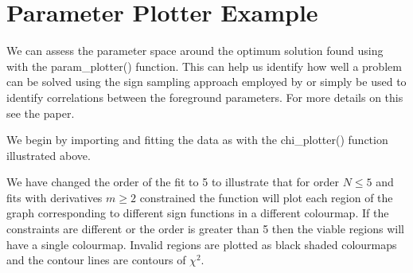 \documentclass[letterpaper,10pt,english]{sphinxmanual}
\let\sphinxpxdimen\pdfpxdimen\else\newdimen\sphinxpxdimen
\begin{document}
\noindent{\hspace*{\fill}\sphinxincludegraphics[width=400\sphinxpxdimen]{{chi_distribution}.png}\hspace*{\fill}}


\section{Parameter Plotter Example}
\label{\detokenize{source/maxsmooth:parameter-plotter-example}}
We can assess the parameter space around the optimum solution
found using  with the param\_plotter() function.
This can help us identify how well a problem can be solved using the
sign sampling approach employed by  or simply
be used to identify correlations between the foreground parameters.
For more details on this see the  paper.

We begin by importing and fitting the data as with the chi\_plotter()
function illustrated above.

\begin{sphinxVerbatim}[commandchars=\\\{\}]
   

  
  

   

  
      
\end{sphinxVerbatim}

We have changed the order of the fit to 5 to illustrate that for
order \({N \leq 5}\) and fits with derivatives \({m \geq 2}\) constrained
the function will plot each region of the graph corresponding to
different sign functions in a different colourmap. If the constraints are
different or the order is greater than 5 then the viable regions will have
a single colourmap. Invalid regions are plotted as black shaded colourmaps
and the contour lines are contours of \({\chi^2}\).
\end{document}
